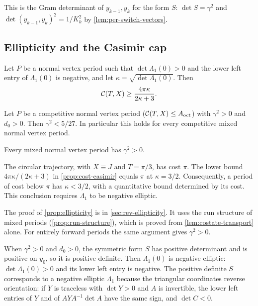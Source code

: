 This is the Gram determinant of $y_{k-1},y_k$ for the form $S$: $\det S=\gamma^2$ and
$\det(y_{k-1},y_k)^2=1/K_k^2$ by \cref{lem:per-switch-vectors}.

\subsection{Ellipticity and the Casimir cap}\label{sec:per-casimir}

\begin{proposition}\label{prop:cost-casimir}
Let $P$ be a normal vertex period such that $\det\Lambda_1(0)>0$ and the lower left entry of
$\Lambda_1(0)$ is negative, and let $\kappa=\sqrt{\det\Lambda_1(0)}$. Then
\[
  \mathcal{C}(T,X)\ge\frac{4\pi\kappa}{2\kappa+3}.
\]
\end{proposition}

\begin{corollary}\label{cor:casimir-cap}
Let $P$ be a competitive normal vertex period ($\mathcal{C}(T,X)\le A_{\mathrm{oct}}$) with $\gamma^2>0$ and
$d_0>0$. Then $\gamma^2<5/27$. In particular this
holds for every competitive mixed normal vertex period.
\end{corollary}

\begin{proposition}[Ellipticity]\label{prop:ellipticity}
Every mixed normal vertex period has $\gamma^2>0$.
\end{proposition}

The circular trajectory, with $X\equiv J$ and $T=\pi/3$, has cost $\pi$. The lower bound
$4\pi\kappa/(2\kappa+3)$ in \cref{prop:cost-casimir} equals $\pi$ at $\kappa=3/2$. Consequently, a
period of cost below $\pi$ has $\kappa<3/2$, with a quantitative bound determined by its cost.
This conclusion requires $\Lambda_1$ to be negative elliptic.



The proof of \cref{prop:ellipticity} is in \cref{sec:rev-ellipticity}. It uses the run structure of mixed periods
(\cref{prop:run-structure}), which is proved from \cref{lem:costate-transport} alone. For
entirely forward periods the same argument gives $\gamma^2>0$.

When $\gamma^2>0$ and $d_0>0$, the symmetric form $S$ has positive determinant and is positive on
$y_0$, so it is positive definite. Then $\Lambda_1(0)$ is negative elliptic: $\det\Lambda_1(0)>0$
and its lower left entry is negative. The positive definite $S$ corresponds to a negative elliptic
$\Lambda_1$ because the triangular coordinates reverse orientation: if $Y$ is traceless with
$\det Y>0$ and $A$ is invertible, the lower left entries of $Y$ and of $AYA^{-1}\det A$ have the
same sign, and $\det C<0$.

